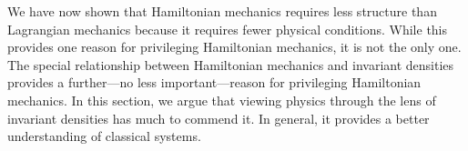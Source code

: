 \documentclass[letterpaper]{article}
\begin{document}

We have now shown that Hamiltonian mechanics requires less structure than Lagrangian mechanics because it requires fewer physical conditions. While this provides one reason for privileging Hamiltonian mechanics, it is not the only one. The special relationship between Hamiltonian mechanics and invariant densities provides a further---no less important---reason for privileging Hamiltonian mechanics. In this section, we argue that viewing physics through the lens of invariant densities has much to commend it. In general, it provides a better understanding of classical systems. 
\end{document}
